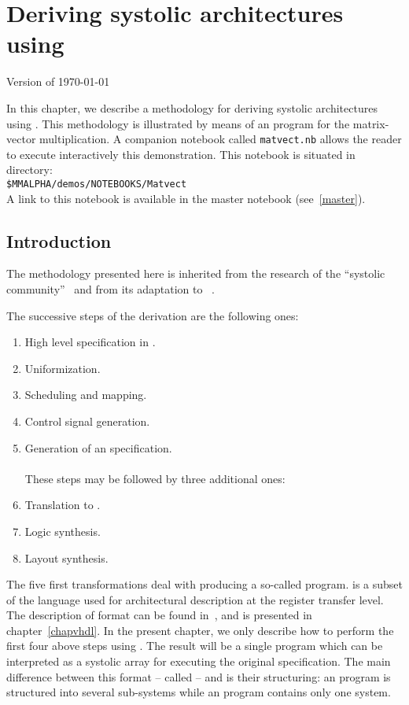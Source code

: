 \chapter{Deriving systolic architectures using {\alfa}}
\label{chapderiving}

{\sc Version of \today}

In this chapter, we describe a methodology for deriving
systolic architectures using {\mmalfa}. This methodology is illustrated by means of an {\alfa}
program for the matrix-vector multiplication. A companion
notebook called \texttt{matvect.nb} allows the reader to
execute interactively this demonstration. This notebook is
situated in directory:\\
\texttt{\$MMALPHA/demos/NOTEBOOKS/Matvect}\\
A link to this notebook is available in the 
master notebook (see~\ref{master}).

\section{Introduction}

The methodology presented here is inherited from the research of the
``systolic community''~\cite{Meg1,KungHT,QuintonRo89} and from its
adaptation to {\alfa}~\cite{SieWilde94,Dinechin96c,Patricia96}.

The successive steps of the derivation are the following ones:
\begin{enumerate}
\item High level specification in {\alfa}.
\item Uniformization.
\item Scheduling and mapping.
\item Control signal generation.
\item \label{step5} Generation of an {\alphard} specification. 	\\
~\\These steps may be followed by three additional ones: 
\item Translation to {\vhdl}.
\item Logic synthesis.
\item Layout synthesis.
\end{enumerate}

The five first transformations deal with producing a so-called
\alphard{} program.  {\alphard} is a subset of the {\alfa} language
used for architectural description at the register transfer level.
The description of {\alphard} format can be found
in~\cite{Patricia96}, and is presented in chapter~\ref{chapvhdl}.  In
the present chapter, we only describe how to perform the first four above
steps using {\mmalfa}. The result will be a single {\alfa}
program which can be interpreted as a systolic array for executing the
original {\alfa} specification. The main difference between this
format -- called {\alphaz} -- and {\alphard} is their structuring: an
{\alphard} program is structured into several sub-systems while an
{\alphaz} program contains only one {\alfa} system.

